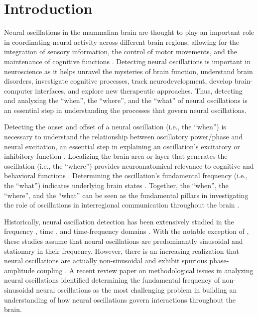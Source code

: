 \documentclass[11pt]{article}
\begin{document}
\section{Introduction}
Neural oscillations in the mammalian brain are thought to play an important role in coordinating neural activity across different brain regions, allowing for the integration of sensory information, the control of motor movements, and the maintenance of cognitive functions \citep{pfurtscheller1999,caplan2003,buzsaki2004,jensen2010,giraud2012,schalk2015,fries2015}. Detecting neural oscillations is important in neuroscience as it helps unravel the mysteries of brain function, understand brain disorders, investigate cognitive processes, track neurodevelopment, develop brain-computer interfaces, and explore new therapeutic approaches. Thus, detecting and analyzing the ``when'', the ``where'', and the ``what'' of neural oscillations is an essential step in understanding the processes that govern neural oscillations.

Detecting the onset and offset of a neural oscillation (i.e., the ``when'') is necessary to understand the relationship between oscillatory power/phase and neural excitation, an essential step in explaining an oscillation's excitatory or inhibitory function \citep{pfurtscheller1999,canolty2006,klimesch2007,haegens2011,depesters2016}. Localizing the brain area or layer that generates the oscillation (i.e., the ``where'') provides neuroanatomical relevance to cognitive and behavioral functions \citep{buzsaki2004,miller2010}. Determining the oscillation's fundamental frequency (i.e., the ``what'') indicates underlying brain states \citep{penfield1954,buzsaki2004}. Together, the ``when'', the ``where'', and the ``what'' can be seen as the fundamental pillars in investigating the role of oscillations in interregional communication throughout the brain \citep{fries2015}.

Historically, neural oscillation detection has been extensively studied in the frequency \citep{wen2016,donoghue2020,ostlund2022}, time \citep{hughes2012,gips2017}, and time-frequency domains \citep{chen2011,wilson2022,neymotin2022}. With the notable exception of \citet{gips2017}, these studies assume that neural oscillations are predominantly sinusoidal and stationary in their frequency. However, there is an increasing realization that neural oscillations are actually non-sinusoidal and exhibit spurious phase-amplitude coupling \citep{belluscio2012,cole2017,scheffer2016,gips2017,donoghue2022}. A recent review paper on methodological issues in analyzing neural oscillations \citep{donoghue2022} identified determining the fundamental frequency of non-sinusoidal neural oscillations as the most challenging problem in building an understanding of how neural oscillations govern interactions throughout the brain.
\end{document}
